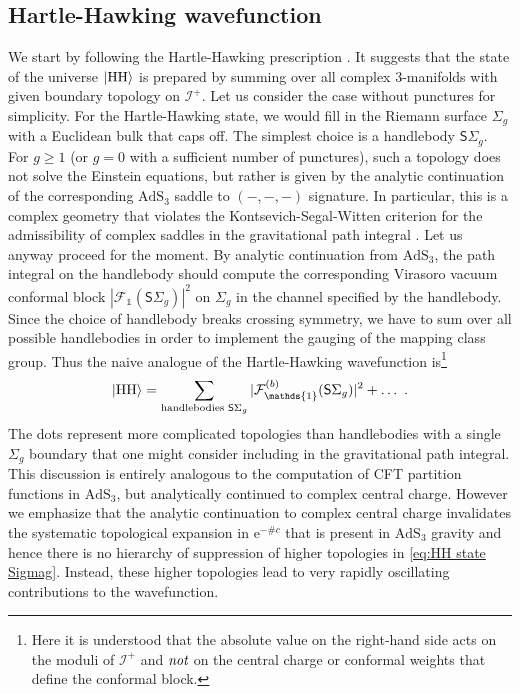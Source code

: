\documentclass[12pt,a4paper]{article}
\newcommand{\be}{\begin{equation}}
\newcommand{\ee}{\end{equation}}
\renewcommand{\ge}{\geqslant}
\begin{document}
\subsection{Hartle-Hawking wavefunction}

We start by following the Hartle-Hawking prescription \cite{Hartle:1983ai}. It suggests that the state of the universe $\ket{\text{HH}}$ is prepared by summing over all complex 3-manifolds with given boundary topology on $\mathcal{I}^+$.
Let us consider the case without punctures for simplicity.
For the Hartle-Hawking state, we would fill in the Riemann surface $\Sigma_g$ with a Euclidean bulk that caps off. The simplest choice is a handlebody $\mathsf{S}\Sigma_g$. For $g \ge 1$ (or $g=0$ with a sufficient number of punctures), such a topology does not solve the Einstein equations, but rather is given by the analytic continuation of the corresponding $\mathrm{AdS}_3$ saddle to $(-,-,-)$ signature. In particular, this is a complex geometry that violates the Kontsevich-Segal-Witten criterion for the admissibility of complex saddles in the gravitational path integral \cite{Kontsevich:2021dmb, Witten:2021nzp}. Let us anyway proceed for the moment. By analytic continuation from $\mathrm{AdS}_3$, the path integral on the handlebody should compute the corresponding Virasoro vacuum conformal block $|\mathcal{F}_{\mathds{1}}(\mathsf{S}\Sigma_g)|^2$ on $\Sigma_g$ in the channel specified by the handlebody. Since the choice of handlebody breaks crossing symmetry, we have to sum over all possible handlebodies in order to implement the gauging of the mapping class group. Thus the naive analogue of the Hartle-Hawking wavefunction is\footnote{Here it is understood that the absolute value on the right-hand side acts on the moduli of $\mathcal{I}^+$ and $\emph{not}$ on the central charge or conformal weights that define the conformal block.}
\be 
\ket{\text{HH}}=\sum_{\text{handlebodies }\mathsf{S}\Sigma_g} |\mathcal{F}_{\mathds{1}}^{(b)}(\mathsf{S}\Sigma_g)|^2+ \dots~. \label{eq:HH state Sigmag}
\ee
The dots represent more complicated topologies than handlebodies with a single $\Sigma_g$ boundary that one might consider including in the gravitational path integral.
This discussion is entirely analogous to the computation of CFT partition functions in $\mathrm{AdS}_3$, but analytically continued to complex central charge. However we emphasize that the analytic continuation to complex central charge invalidates the systematic topological expansion in $\mathrm{e}^{-\# c}$ that is present in $\mathrm{AdS}_3$ gravity and hence there is no hierarchy of suppression of higher topologies in \eqref{eq:HH state Sigmag}. Instead, these higher topologies lead to very rapidly oscillating contributions to the wavefunction. 
\end{document}
